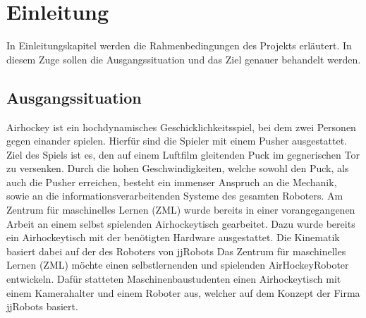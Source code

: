 \chapter{Einleitung}
\label{ch:Einleitung}


In Einleitungskapitel werden die Rahmenbedingungen des Projekts erläutert.
In diesem Zuge sollen die Ausgangssituation und das Ziel genauer behandelt werden.
\section{Ausgangssituation}
\label{sect:Ausgangssituation}
Airhockey ist ein hochdynamisches Geschicklichkeitsspiel, bei dem zwei Personen gegen einander spielen. Hierfür sind die Spieler mit einem Pusher ausgestattet. Ziel des Spiels
ist es, den auf einem Luftfilm gleitenden Puck im gegnerischen Tor zu versenken. Durch
die hohen Geschwindigkeiten, welche sowohl den Puck, als auch die Pusher erreichen, besteht ein immenser Anspruch an die Mechanik, sowie an die informationsverarbeitenden
Systeme des gesamten Roboters.
Am Zentrum für maschinelles Lernen (ZML) wurde bereits in einer vorangegangenen Arbeit an einem selbst spielenden Airhockeytisch gearbeitet. Dazu wurde bereits ein Airhockeytisch mit der benötigten Hardware ausgestattet. Die Kinematik basiert dabei auf der des Roboters von jjRobots \cite{jjrob}
Das Zentrum für maschinelles Lernen (ZML) möchte einen selbstlernenden und spielenden AirHockeyRoboter entwickeln. Dafür statteten Maschinenbaustudenten einen Airhockeytisch mit einem Kamerahalter und einem Roboter aus, welcher auf dem Konzept
der Firma jjRobots basiert.



\newpage
